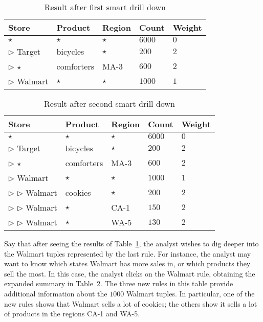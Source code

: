 \begin{example}
\begin{table}
\scriptsize
\centering
\begin{tabular}{| l | l | l | l | l |}
\hline Store & Product & Region & Count & Weight \\
\hline
$\star$ & $\star$ & $\star$ & $6000$ & $0$ \\ \hline
$\triangleright$ Target & bicycles & $\star$ & $200$ & $2$ \\ \hline
$\triangleright$ $\star$ & comforters & MA-3 & $600$ & $2$ \\ \hline
$\triangleright$ Walmart & $\star$ & $\star$ & $1000$ & $1$ \\ \hline
\end{tabular}
\caption{Result after first smart drill down}\label{table:introexample}
\end{table}

\begin{table}
\scriptsize
\centering
\begin{tabular}{| l | l | l | l | l |}
\hline Store & Product & Region & Count & Weight \\
\hline
$\star$ & $\star$ & $\star$ & $6000$ & $0$ \\  \cline{1-5}
$\triangleright$ Target & bicycles & $\star$ & $200$ & $2$ \\ \cline{1-5}
$\triangleright$ $\star$ & comforters & MA-3 & $600$ & $2$ \\ \cline{1-5}
$\triangleright$ Walmart & $\star$ & $\star$ & $1000$ & $1$ \\ \cline{2-5}
$\triangleright$ $\triangleright$ Walmart & cookies & $\star$ & $200$ & $2$ \\ \cline{2-5}
$\triangleright$ $\triangleright$ Walmart & $\star$ & CA-1 & $150$ & $2$ \\ \cline{2-5}
$\triangleright$ $\triangleright$ Walmart & $\star$ & WA-5 & $130$ & $2$ \\ \hline
\end{tabular}
\caption{Result after second smart drill down} \label{table:introexample2}
\end{table}

Say that after seeing the results of Table~\ref{table:introexample},
the analyst wishes to dig deeper into the Walmart tuples
represented by the last rule.
For instance, the analyst may want to know
which states Walmart has more sales in, or which products they sell
the most. In this case, the analyst clicks on the Walmart rule,
obtaining the expanded summary in Table~\ref{table:introexample2}.
The three new rules in this table provide additional information
about the $1000$ Walmart tuples.
In particular, one of the new rules shows that
Walmart sells a lot of cookies; the others show it sells a lot of products in
the regions CA-1 and WA-5.


\end{example}
